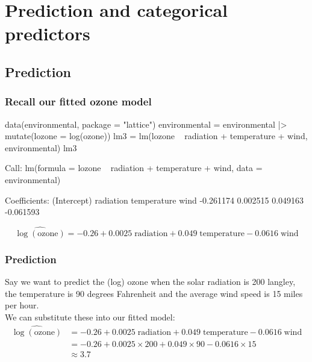 \documentclass[a4paper]{article}
\begin{document}
\section{Prediction and categorical predictors}\label{sec:28}
\subsection{Prediction}
\subsubsection{Recall our fitted ozone model}
\begin{Schunk}
\begin{Sinput}
data(environmental, package = "lattice")
environmental = environmental |> 
  mutate(lozone = log(ozone))
lm3 = lm(lozone ~ radiation + temperature + wind, environmental)
lm3
\end{Sinput}
\begin{Soutput}

Call:
lm(formula = lozone ~ radiation + temperature + wind, data = environmental)

Coefficients:
(Intercept)    radiation  temperature         wind  
  -0.261174     0.002515     0.049163    -0.061593  
\end{Soutput}
\end{Schunk}
\[
	\widehat{\log(\text{ozone})} = -0.26 + 0.0025\; \text{radiation} + 0.049\; \text{temperature} - 0.0616\; \text{wind}
\]
\subsubsection{Prediction}
Say we want to predict the (log) ozone when the solar radiation is 200 langley, the temperature is 90 degrees Fahrenheit and the average wind speed is 15 miles per hour.\\
We can substitute these into our fitted model:
\begin{align*}
	\widehat{\log(\text{ozone})} &= -0.26 + 0.0025\; \text{radiation} + 0.049\; \text{temperature} - 0.0616\; \text{wind}\\
	& = -0.26 + 0.0025\times 200 + 0.049\times 90 - 0.0616\times 15 \\
	& \approx 3.7
\end{align*}
\end{document}
